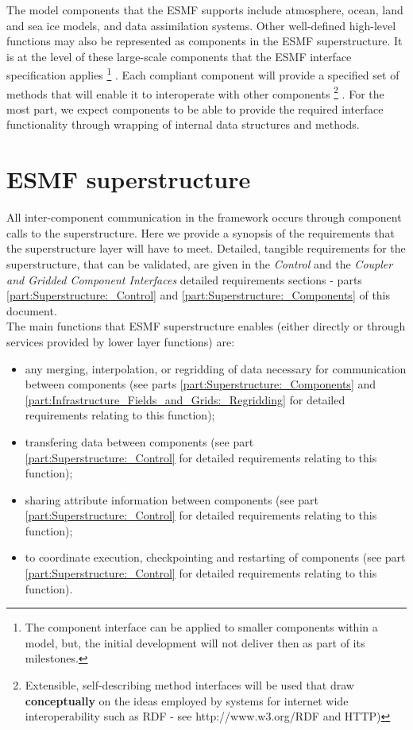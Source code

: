 The model components that the ESMF supports include atmosphere, ocean,
land and sea ice models, and data assimilation systems. Other
well-defined high-level functions may also be represented as
components in the ESMF superstructure.  It is at the level of these
large-scale components that the ESMF interface specification applies
\footnote{
The component interface can be applied to smaller components within a model,
but, the initial development will not deliver then as part of its milestones.
}
.
Each compliant component will provide a specified set of methods that
will enable it to interoperate with other components \footnote{
Extensible, self-describing method interfaces will be used that draw
{\bf conceptually} on the ideas employed by systems for internet
wide interoperability such as RDF - see http://www.w3.org/RDF and HTTP)
}
.  For the most
part, we expect components to be able to provide the required
interface functionality through wrapping of internal data structures
and methods. 

\section{ESMF superstructure}
\label{sec:ESMF_superstructure}

All inter-component communication in the framework occurs through 
component calls to the superstructure. Here we provide a synopsis of the
requirements that the superstructure layer will have to meet.
Detailed, tangible requirements for the superstructure, that can
be validated, are given in the {\it Control} and the {\it Coupler and
Gridded Component Interfaces} detailed requirements sections -
parts \ref{part:Superstructure:_Control} and \ref{part:Superstructure:_Components} of this document. \\

\noindent The main functions that ESMF superstructure enables (either
directly or through services provided by lower layer functions) are:

\begin{itemize}
\item any merging, interpolation, or regridding 
of data necessary for communication between components
(see parts \ref{part:Superstructure:_Components} 
and \ref{part:Infrastructure_Fields_and_Grids:_Regridding} for detailed requirements relating
to this function);
\item transfering data between components (see part \ref{part:Superstructure:_Control} for detailed 
requirements relating to this function);
\item sharing attribute information between components
(see part \ref{part:Superstructure:_Control} for detailed requirements relating
to this function);
\item to coordinate execution, checkpointing and restarting of
  components (see part \ref{part:Superstructure:_Control} for detailed 
requirements relating to this function).
\end{itemize}

